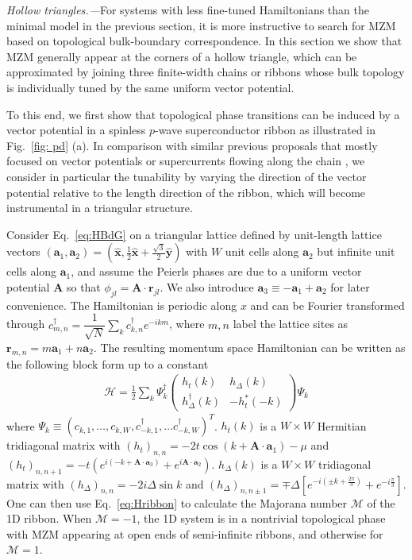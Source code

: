 \documentclass[aps,prb,twocolumn,showpacs,amsmath,amssymb,superscriptaddress]{revtex4-2}
\let\oldhat\hat
\renewcommand{\hat}[1]{\oldhat{\mathbf{#1}}}
\newcommand{\ham}{\mathcal{H}}
\newcommand{\cc}{c^{\dagger}}
\newcommand{\de}{\Delta}
\begin{document}
\emph{Hollow triangles.---}For systems with less fine-tuned Hamiltonians than the minimal model in the previous section, it is more instructive to search for MZM based on topological bulk-boundary correspondence. In this section we show that MZM generally appear at the corners of a hollow triangle, which can be approximated by joining three finite-width chains or ribbons whose bulk topology is individually tuned by the same uniform vector potential.

To this end, we first show that topological phase transitions can be induced by a vector potential in a spinless $p$-wave superconductor ribbon as illustrated in Fig.~\ref{fig: pd} (a). In comparison with similar previous proposals that mostly focused on vector potentials or supercurrents flowing along the chain \cite{romitoManipulatingMajoranaFermions2012, takasanSupercurrentinducedTopologicalPhase2022}, we consider in particular the tunability by varying the direction of the vector potential relative to the length direction of the ribbon, which will become instrumental in a triangular structure.

Consider Eq.~\eqref{eq:HBdG} on a triangular lattice defined by unit-length lattice vectors $(\mathbf a_1, \mathbf a_2) = (\hat{x}, \frac{1}{2}\hat{x} + \frac{\sqrt{3}}{2}\hat{y})$ with $W$ unit cells along $\mathbf a_2$ but infinite unit cells along $\mathbf a_1$, and assume the Peierls phases are due to a uniform vector potential $\mathbf A$ so that $\phi_{jl} = \mathbf A\cdot \mathbf r_{jl}$. We also introduce $\mathbf a_3 \equiv -\mathbf a_1 + \mathbf a_2$ for later convenience. The Hamiltonian is periodic along $x$ and can be Fourier transformed through $\cc_{m,n} = \dfrac{1}{\sqrt{N}} \sum_{k} \cc_{k,n} e^{-i km}$, where $m,n$ label the lattice sites as $\mathbf r_{m,n} = m\mathbf a_1 + n \mathbf a_2$. The resulting momentum space Hamiltonian can be written as the following block form up to a constant
\begin{eqnarray}\label{eq:Hribbon}
      \ham = \frac{1}{2} \sum_k \Psi_k^\dagger \left(
    \begin{matrix}
      h_t(k) & h_\Delta(k) \\
      h_\Delta^\dagger(k) & -h_t^*(-k)
    \end{matrix} \right)
    \Psi_k
\end{eqnarray}
where $\Psi_k \equiv (c_{k,1},\dots, c_{k,W},c^\dag_{-k,1},\dots c_{-k,W}^\dag)^T$. $h_t(k)$ is a $W\times W$ Hermitian tridiagonal matrix with $(h_t)_{n,n} = -2t\cos(k+\mathbf A\cdot \mathbf a_1) - \mu$ and $(h_t)_{n,n+1} = -t\left( e^{i(-k+\mathbf A\cdot \mathbf a_3)}  + e^{i\mathbf A \cdot \mathbf a_2}\right)$. $h_\Delta(k)$ is a $W\times W$ tridiagonal matrix with $(h_\Delta)_{n,n} = -2i\de \sin k $ and $(h_\Delta)_{n,n\pm 1} = \mp \de\left[ e^{-i(\pm k + \frac{2\pi}{3})} + e^{-i\frac{\pi}{3}} \right]$. One can then use Eq.~\eqref{eq:Hribbon} to calculate the Majorana number \cite{kitaevUnpairedMajoranaFermions2001,liTopologicalSuperconductivityInduced2014} $\mathcal{M}$ of the 1D ribbon. When $\mathcal{M} = -1$, the 1D system is in a nontrivial topological phase with MZM appearing at open ends of semi-infinite ribbons, and otherwise for $\mathcal{M} = 1$.
\end{document}
